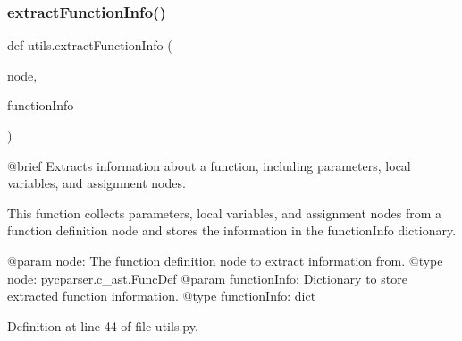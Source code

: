 \subsubsection{\texorpdfstring{extract\+Function\+Info()}{extractFunctionInfo()}}
{\footnotesize\ttfamily def utils.\+extract\+Function\+Info (\begin{DoxyParamCaption}\item[{}]{node,  }\item[{}]{function\+Info }\end{DoxyParamCaption})}

\begin{DoxyVerb}@brief Extracts information about a function, including parameters, local variables, and assignment nodes.

This function collects parameters, local variables, and assignment nodes from a function definition node and
stores the information in the functionInfo dictionary.

@param node: The function definition node to extract information from.
@type node: pycparser.c_ast.FuncDef
@param functionInfo: Dictionary to store extracted function information.
@type functionInfo: dict
\end{DoxyVerb}
 

Definition at line 44 of file utils.\+py.


